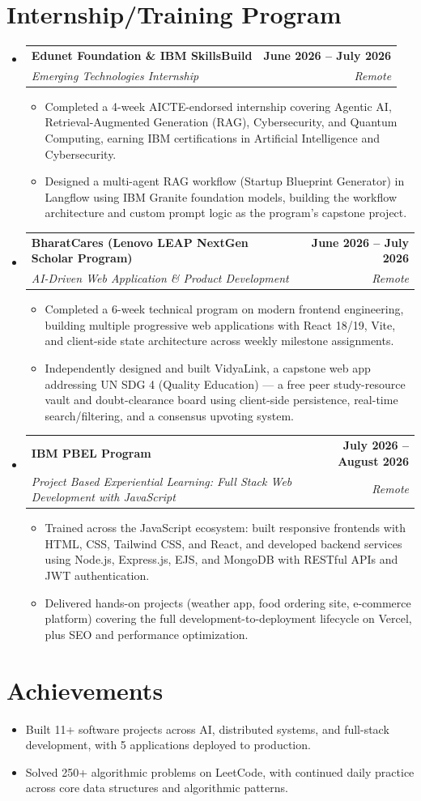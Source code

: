 \documentclass[letterpaper,10pt]{article}
\makeatletter
\newcommand{\resumeItem}[1]{
  \item\small{
    {#1 \vspace{-2pt}}
  }
}
\newcommand{\resumeSubheading}[4]{
  \vspace{-2pt}\item
    \begin{tabular*}{1.0\textwidth}[t]{l@{\extracolsep{\fill}}r}
      \textbf{#1} & \textbf{\small #2} \\
      \textit{\small#3} & \textit{\small #4} \\
    \end{tabular*}\vspace{-7pt}
}
\newcommand{\resumeSubHeadingListStart}{\begin{itemize}[leftmargin=0.0in, label={}]}
\newcommand{\resumeSubHeadingListEnd}{\end{itemize}}
\newcommand{\resumeItemListStart}{\begin{itemize}}
\newcommand{\resumeItemListEnd}{\end{itemize}\vspace{-5pt}}
\makeatother
\begin{document}
\section{Internship/Training Program}
  \resumeSubHeadingListStart
    \resumeSubheading
      {Edunet Foundation \& IBM SkillsBuild}{June 2026 -- July 2026}
      {Emerging Technologies Internship}{Remote}
      \resumeItemListStart
        \resumeItem{Completed a 4-week AICTE-endorsed internship covering Agentic AI, Retrieval-Augmented Generation (RAG), Cybersecurity, and Quantum Computing, earning IBM certifications in Artificial Intelligence and Cybersecurity.}
        \resumeItem{Designed a multi-agent RAG workflow (Startup Blueprint Generator) in Langflow using IBM Granite foundation models, building the workflow architecture and custom prompt logic as the program's capstone project.}
      \resumeItemListEnd
    \resumeSubheading
      {BharatCares (Lenovo LEAP NextGen Scholar Program)}{June 2026 -- July 2026}
      {AI-Driven Web Application \& Product Development}{Remote}
      \resumeItemListStart
        \resumeItem{Completed a 6-week technical program on modern frontend engineering, building multiple progressive web applications with React 18/19, Vite, and client-side state architecture across weekly milestone assignments.}
        \resumeItem{Independently designed and built VidyaLink, a capstone web app addressing UN SDG 4 (Quality Education) — a free peer study-resource vault and doubt-clearance board using client-side persistence, real-time search/filtering, and a consensus upvoting system.}
      \resumeItemListEnd
    \resumeSubheading
      {IBM PBEL Program}{July 2026 -- August 2026}
      {Project Based Experiential Learning: Full Stack Web Development with JavaScript}{Remote}
      \resumeItemListStart
        \resumeItem{Trained across the JavaScript ecosystem: built responsive frontends with HTML, CSS, Tailwind CSS, and React, and developed backend services using Node.js, Express.js, EJS, and MongoDB with RESTful APIs and JWT authentication.}
        \resumeItem{Delivered hands-on projects (weather app, food ordering site, e-commerce platform) covering the full development-to-deployment lifecycle on Vercel, plus SEO and performance optimization.}
      \resumeItemListEnd
  \resumeSubHeadingListEnd
\vspace{-12pt}

\section{Achievements}
      \resumeItemListStart
\resumeItem{Built 11+ software projects across AI, distributed systems, and full-stack development, with 5 applications deployed to production.}
  \vspace{-16pt}
\resumeItem{Solved 250+ algorithmic problems on LeetCode, with continued daily practice across core data structures and algorithmic patterns.}
     \resumeItemListEnd
\end{document}
